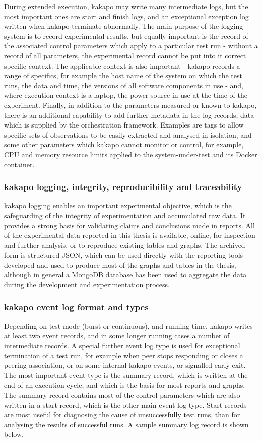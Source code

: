 During extended execution, kakapo may write many intermediate logs, but the most important ones are start and finish logs, and an exceptional exception log written when kakapo terminate abnormally.
The main purpose  of the logging system is to record experimental results, but equally important is the record of the associated control parameters which apply to a particular test run - without a record of all parameters, the experimental record cannot be put into it correct specific context.
The applicable context is also important - kakapo records a range of specifics, for example the host name of the system on which the test runs, the data and time, the versions of all software components in use - and, where execution context is a laptop, the power source in use at the time of the experiment.
Finally, in addition to the parameters measured or known to kakapo, there is an additional capability to add further metadata in the log records, data which is supplied by the orchestration framework.
Examples are tags to allow specific sets of observations to be easily extracted and analysed in isolation, and some other parameters which kakapo cannot monitor or control, for example, CPU and memory resource limits applied to the system-under-test and its Docker container.

\subsubsection{kakapo logging, integrity, reproducibility and traceability}
kakapo logging enables an important experimental  objective, which is the safeguarding of the integrity of experimentation and accumulated raw data.
It provides a strong basis for validating claims and conclusions made in reports.
All of the experimental data reported in this thesis is available, online, for inspection and further analysis, or to reproduce existing  tables and graphs.
The archived form is structured JSON, which can be used directly with the reporting tools developed and used to produce most of the graphs and tables in the thesis, although in general a MongoDB database has been used to aggregate the data during the development and experimentation process.

\subsubsection{kakapo event log format and types}
Depending on test mode (burst or continuous), and running time, kakapo writes at least two event records, and in some longer running cases a number of intermediate records.
A special further event log type is used for exceptional termination of a test run, for example when peer stops responding or closes a peering association, or on some internal kakapo events, or signalled early exit.
The most important event type is the summary record, which is written at the end of an execution cycle, and which is the basis for most reports and graphs.
The summary record contains most of the control parameters which are also written in a start record, which is the other main event log type.
Start records are most useful for diagnosing the cause of unsuccessfully test runs, than for analysing the results of successful runs.
A sample summary log record is shown below.

